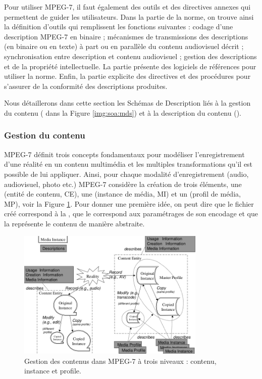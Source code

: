 Pour utiliser MPEG-7, il faut également des outils et des directives annexes qui permettent de guider les utilisateurs. 
Dans la partie  de la norme, on trouve ainsi la définition d'outils qui remplissent les fonctions suivantes : codage d'une description MPEG-7 en binaire ; mécanismes de transmissions des descriptions (en binaire ou en texte) à part ou en parallèle du contenu audiovisuel décrit ;  synchronisation entre description et contenu audiovisuel ; gestion des descriptions et de la propriété intellectuelle. 
La partie  présente des logiciels de références pour utiliser la norme.
Enfin, la partie  explicite des directives et des procédures pour s'assurer de la conformité des descriptions produites.

Nous détaillerons dans cette section les Schémas de Description liés à la gestion du contenu ( dans la Figure \ref{img:soa:mds}) et à la description du contenu ().\\


\subsubsection{Gestion du contenu}
MPEG-7 définit trois concepts fondamentaux pour modéliser l'enregistrement d'une réalité en un contenu multimédia et les multiples transformations qu'il est possible de lui appliquer. 
Ainsi, pour chaque modalité d'enregistrement (audio, audiovisuel, photo etc.) MPEG-7 considère la création de trois éléments, une  (entité de contenu, CE), une  (instance de média, MI) et un  (profil de média, MP), voir la Figure \ref{img:soa:media}.
Pour donner une première idée, on peut dire que le fichier créé correspond à la , que le  correspond aux paramétrages de son encodage et que la  représente le contenu de manière abstraite.

\begin{figure}[ht!]
\centering
\includegraphics[width=0.8\textwidth]{images/MPEG-7-MediaManagement.png}
\caption{Gestion des contenus dans MPEG-7 à trois niveaux : contenu, instance et profile.}
\label{img:soa:media}
\end{figure}



